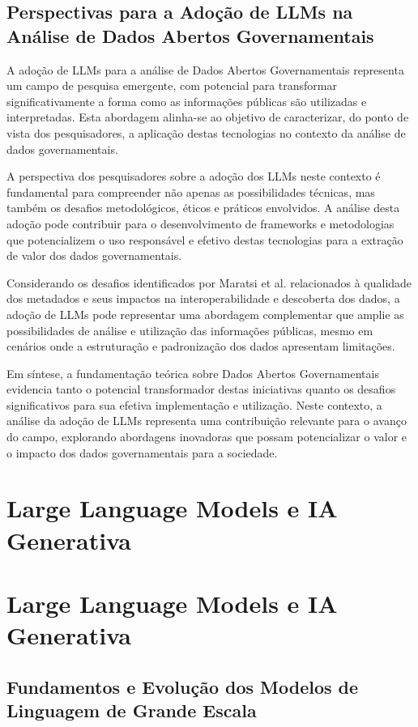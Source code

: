 \subsection{Perspectivas para a Adoção de LLMs na Análise de Dados Abertos Governamentais}

A adoção de LLMs para a análise de Dados Abertos Governamentais representa um campo de pesquisa emergente, com potencial para transformar significativamente a forma como as informações públicas são utilizadas e interpretadas. Esta abordagem alinha-se ao objetivo de caracterizar, do ponto de vista dos pesquisadores, a aplicação destas tecnologias no contexto da análise de dados governamentais.

A perspectiva dos pesquisadores sobre a adoção dos LLMs neste contexto é fundamental para compreender não apenas as possibilidades técnicas, mas também os desafios metodológicos, éticos e práticos envolvidos. A análise desta adoção pode contribuir para o desenvolvimento de frameworks e metodologias que potencializem o uso responsável e efetivo destas tecnologias para a extração de valor dos dados governamentais.

Considerando os desafios identificados por Maratsi et al. \cite{ref_6} relacionados à qualidade dos metadados e seus impactos na interoperabilidade e descoberta dos dados, a adoção de LLMs pode representar uma abordagem complementar que amplie as possibilidades de análise e utilização das informações públicas, mesmo em cenários onde a estruturação e padronização dos dados apresentam limitações.

Em síntese, a fundamentação teórica sobre Dados Abertos Governamentais evidencia tanto o potencial transformador destas iniciativas quanto os desafios significativos para sua efetiva implementação e utilização. Neste contexto, a análise da adoção de LLMs representa uma contribuição relevante para o avanço do campo, explorando abordagens inovadoras que possam potencializar o valor e o impacto dos dados governamentais para a sociedade.


\section{Large Language Models e IA Generativa}
\section{Large Language Models e IA Generativa}

\subsection{Fundamentos e Evolução dos Modelos de Linguagem de Grande Escala}

